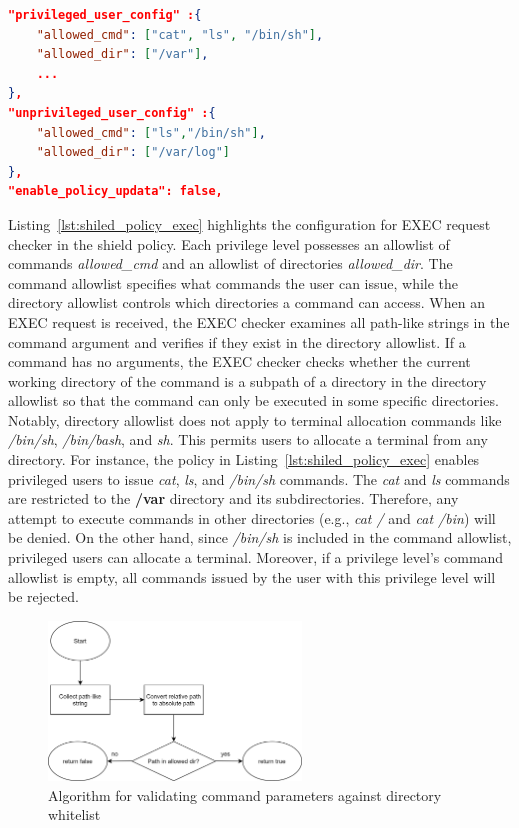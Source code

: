 \begin{lstlisting}[language=json, caption= EXEC request checker's configuration in the shield policy, label={lst:shiled_policy_exec}]
"privileged_user_config" :{
    "allowed_cmd": ["cat", "ls", "/bin/sh"],
    "allowed_dir": ["/var"],
    ...
},
"unprivileged_user_config" :{
    "allowed_cmd": ["ls","/bin/sh"],
    "allowed_dir": ["/var/log"]    
},
"enable_policy_updata": false,
\end{lstlisting}

Listing~\ref*{lst:shiled_policy_exec} highlights the configuration for EXEC request checker in the shield policy. Each privilege level possesses an allowlist of commands \emph{allowed\_cmd} and an allowlist of directories \emph{allowed\_dir}. The command allowlist specifies what commands the user can issue, while the 
directory allowlist controls which directories a command can access. When an EXEC request is received, the EXEC checker examines all path-like strings in the command argument and verifies if they exist in the directory allowlist. If a command has no arguments, the EXEC checker checks whether the current working directory of 
the command is a subpath of a directory in the directory allowlist so that the command can only be executed in some specific directories. Notably, directory allowlist does not apply to terminal allocation commands like \emph{/bin/sh}, \emph{/bin/bash}, and \emph{sh}. This permits users to allocate a terminal 
from any directory. For instance, the policy in Listing~\ref*{lst:shiled_policy_exec} enables privileged users to issue \emph{cat}, \emph{ls}, and \emph{/bin/sh} commands. The \emph{cat} and \emph{ls} commands are restricted to the \textbf{/var} directory and its subdirectories. Therefore, any attempt to execute commands in other directories (e.g., 
\emph{cat /} and \emph{cat /bin}) will be denied. On the other hand, since \emph{/bin/sh} is included in the command allowlist, privileged users can allocate a terminal. Moreover, if a privilege level's command allowlist is empty, all commands issued by the user with this privilege level will be rejected.

\begin{figure}[!htb]
    \centering
    \includegraphics[width=0.6\textwidth]{images/algo_for_path_checking.png}
    \caption[Algorithm for validating command parameters against directory whitelist]{Algorithm for validating command parameters against directory whitelist}
    \label{fig:algo_for_path_checking}
\end{figure}



